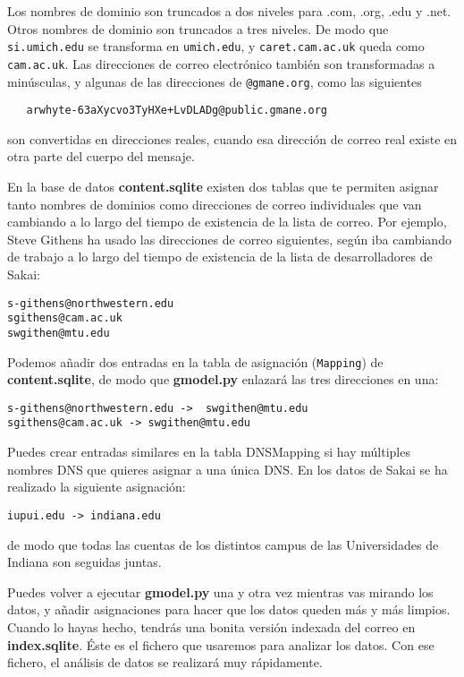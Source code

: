 Los nombres de dominio son truncados a dos niveles para .com, .org, .edu y .net.
Otros nombres de dominio son truncados a tres niveles. De modo que {\tt si.umich.edu} se transforma en
{\tt umich.edu}, y {\tt caret.cam.ac.uk} queda como {\tt cam.ac.uk}. Las direcciones de correo electrónico también
son transformadas a minúsculas, y algunas de las direcciones de {\tt @gmane.org}, como las siguientes

\beforeverb
\begin{verbatim}
   arwhyte-63aXycvo3TyHXe+LvDLADg@public.gmane.org
\end{verbatim}
\afterverb
%
son convertidas en direcciones reales, cuando esa dirección de correo real existe
en otra parte del cuerpo del mensaje.

En la base de datos {\bf content.sqlite} existen dos tablas que te permiten
asignar tanto nombres de dominios como direcciones de correo individuales que van cambiando
a lo largo del tiempo de existencia de la lista de correo. Por ejemplo, Steve Githens ha usado las
direcciones de correo siguientes, según iba cambiando de trabajo a lo largo del tiempo de existencia
de la lista de desarrolladores de Sakai:

\beforeverb
\begin{verbatim}
s-githens@northwestern.edu
sgithens@cam.ac.uk
swgithen@mtu.edu
\end{verbatim}
\afterverb
%
Podemos añadir dos entradas en la tabla de asignación ({\tt Mapping}) de {\bf content.sqlite}, de modo
que {\bf gmodel.py} enlazará las tres direcciones en una:

\beforeverb
\begin{verbatim}
s-githens@northwestern.edu ->  swgithen@mtu.edu
sgithens@cam.ac.uk -> swgithen@mtu.edu
\end{verbatim}
\afterverb
%
Puedes crear entradas similares en la tabla DNSMapping si hay múltiples nombres
DNS que quieres asignar a una única DNS. En los datos de Sakai se ha realizado la siguiente asignación:

\beforeverb
\begin{verbatim}
iupui.edu -> indiana.edu
\end{verbatim}
\afterverb
%
de modo que todas las cuentas de los distintos campus de las Universidades de Indiana son
seguidas juntas.

Puedes volver a ejecutar {\bf gmodel.py} una y otra vez mientras vas mirando los datos, y añadir
asignaciones para hacer que los datos queden más y más limpios. Cuando lo hayas hecho, tendrás una bonita
versión indexada del correo en {\bf index.sqlite}. Éste es el fichero que usaremos para
analizar los datos. Con ese fichero, el análisis de datos se realizará muy rápidamente.

